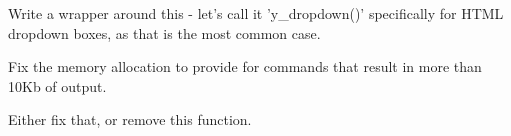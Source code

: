 
\begin{DoxyRefList}
\item[\label{todo__todo000003}%
\hypertarget{todo__todo000003}{}%
Member \hyperlink{y__param__array_8c_a05e37464446a74ba0874eb3f85f4abd4}{y\-\_\-array\-\_\-save\-\_\-param\-\_\-list} (const char $\ast$source\-Param, const char $\ast$\-L\-B, const char $\ast$\-R\-B, const char $\ast$result\-\_\-array)]Write a wrapper around this -\/ let's call it 'y\-\_\-dropdown()' specifically for H\-T\-M\-L dropdown boxes, as that is the most common case. 
\item[\label{todo__todo000001}%
\hypertarget{todo__todo000001}{}%
Member \hyperlink{group__loadrunner__utils_gaa6724943ea9deafd1a035fd2957774bf}{y\-\_\-execute\-\_\-shell\-\_\-command} (char $\ast$command, int debug)]Fix the memory allocation to provide for commands that result in more than 10\-Kb of output. 
\item[\label{todo__todo000002}%
\hypertarget{todo__todo000002}{}%
Member \hyperlink{y__logging_8c_a945fff57d0f423529adf29ec8efc1e6a}{y\-\_\-log\-\_\-turn\-\_\-on} ()]Either fix that, or remove this function.
\end{DoxyRefList}